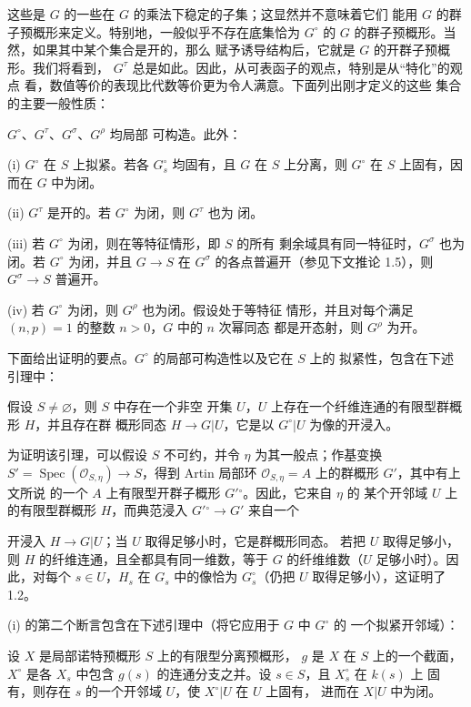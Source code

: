 这些是 $G$ 的一些在 $G$ 的乘法下稳定的子集；这显然并不意味着它们
能用 $G$ 的群子预概形来定义。特别地，一般似乎不存在底集恰为
$G^\circ$ 的 $G$ 的群子预概形。当然，如果其中某个集合是开的，那么
赋予诱导结构后，它就是 $G$ 的开群子预概形。我们将看到，
$G^\tau$ 总是如此。因此，从可表函子的观点，特别是从“特化”的观点
看，数值等价的表现比代数等价更为令人满意。下面列出刚才定义的这些
集合的主要一般性质：

 $G^\circ$、$G^\tau$、$G^\sigma$、$G^\rho$ 均局部
可构造。此外：

\noindent (i) $G^\circ$ 在 $S$ 上拟紧。若各 $G_s^\circ$ 均固有，且
$G$ 在 $S$ 上分离，则 $G^\circ$ 在 $S$ 上固有，因而在 $G$ 中为闭。

\noindent (ii) $G^\tau$ 是开的。若 $G^\circ$ 为闭，则 $G^\tau$ 也为
闭。

\noindent (iii) 若 $G^\circ$ 为闭，则在等特征情形，即 $S$ 的所有
剩余域具有同一特征时，$G^\sigma$ 也为闭。若 $G^\circ$ 为闭，并且
$G\longrightarrow S$ 在 $G^\sigma$ 的各点普遍开（参见下文推论
1.5），则 $G^\sigma\longrightarrow S$ 普遍开。

\noindent (iv) 若 $G^\circ$ 为闭，则 $G^\rho$ 也为闭。假设处于等特征
情形，并且对每个满足 $(n,p)=1$ 的整数 $n>0$，$G$ 中的 $n$ 次幂同态
都是开态射，则 $G^\rho$ 为开。

下面给出证明的要点。$G^\circ$ 的局部可构造性以及它在 $S$ 上的
拟紧性，包含在下述引理中：

 假设 $S\neq\varnothing$，则 $S$ 中存在一个非空
开集 $U$，$U$ 上存在一个纤维连通的有限型群概形 $H$，并且存在群
概形同态 $H\longrightarrow G|U$，它是以 $G^\circ|U$ 为像的开浸入。

为证明该引理，可以假设 $S$ 不可约，并令 $\eta$ 为其一般点；作基变换
$S'=\operatorname{Spec}(\mathcal O_{S,\eta})\longrightarrow S$，得到
Artin 局部环 $\mathcal O_{S,\eta}=A$ 上的群概形 $G'$，其中有上文所说
的一个 $A$ 上有限型开群子概形 $G'{}^\circ$。因此，它来自 $\eta$ 的
某个开邻域 $U$ 上的有限型群概形 $H$，而典范浸入
$G'{}^\circ\longrightarrow G'$ 来自一个

开浸入 $H\longrightarrow G|U$；当 $U$ 取得足够小时，它是群概形同态。
若把 $U$ 取得足够小，则 $H$ 的纤维连通，且全都具有同一维数，等于
$G$ 的纤维维数（$U$ 足够小时）。因此，对每个 $s\in U$，$H_s$ 在 $G_s$ 中的像恰为
$G_s^\circ$（仍把 $U$ 取得足够小），这证明了 1.2。

(i) 的第二个断言包含在下述引理中（将它应用于 $G$ 中 $G^\circ$ 的
一个拟紧开邻域）：

 设 $X$ 是局部诺特预概形 $S$ 上的有限型分离预概形，
$g$ 是 $X$ 在 $S$ 上的一个截面，$X^\circ$ 是各 $X_s$ 中包含
$g(s)$ 的连通分支之并。设 $s\in S$，且 $X_s^\circ$ 在 $k(s)$ 上
固有，则存在 $s$ 的一个开邻域 $U$，使 $X^\circ|U$ 在 $U$ 上固有，
进而在 $X|U$ 中为闭。


